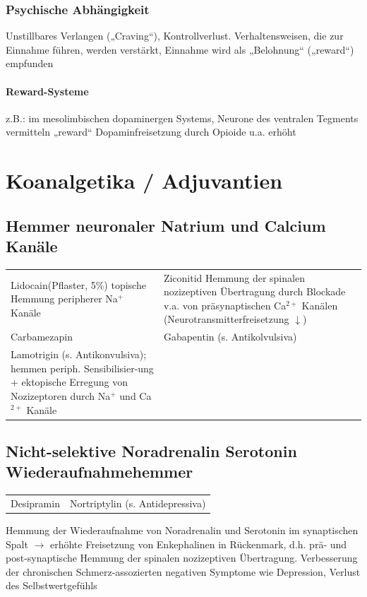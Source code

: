 \documentclass[10pt,a4paper]{report}
\begin{document}
\subsubsection{Psychische Abhängigkeit} %
\label{par:psychische_abh_ngigkeit}
Unstillbares Verlangen („Craving“), Kontrollverlust. Verhaltensweisen, die zur Einnahme führen, werden verstärkt, Einnahme wird als „Belohnung“ („reward“) empfunden
\paragraph{Reward-Systeme} %
\label{subp:reward_systeme}
z.B.: im mesolimbischen dopaminergen Systems, Neurone des ventralen Tegments vermitteln „reward“ Dopaminfreisetzung durch Opioide u.a. erhöht
\section{Koanalgetika / Adjuvantien} %
\label{sec:koanalgetika_adjuvantien}
\subsection{Hemmer neuronaler Natrium und Calcium Kanäle} %
\begin{tabularx}{\textwidth}{XX}
Lidocain(Pflaster, 5\%)  topische Hemmung peripherer Na$^+$ Kanäle&Ziconitid Hemmung der spinalen nozizeptiven Übertragung durch Blockade v.a. von präsynaptischen  Ca$^{2+}$ Kanälen (Neurotransmitterfreisetzung $\downarrow$)\\
Carbamezapin&Gabapentin (s. Antikolvulsiva)\\
Lamotrigin (s. Antikonvulsiva); hemmen periph. Sensibilisier-ung + ektopische Erregung von Nozizeptoren durch Na$^+$ und Ca$^{2+}$ Kanäle\\
\end{tabularx}
\subsection{Nicht-selektive Noradrenalin Serotonin Wiederaufnahmehemmer    } %
\label{sub:nicht_selektive_noradrenalin_serotonin_wiederaufnahmehemmer_}
\begin{tabularx}{\textwidth}{XX}
Desipramin&Nortriptylin (s. Antidepressiva)\\
\end{tabularx}
Hemmung der Wiederaufnahme von Noradrenalin und Serotonin im synaptischen Spalt $\rightarrow$ erhöhte Freisetzung von Enkephalinen in Rückenmark, d.h. prä- und post-synaptische Hemmung der spinalen nozizeptiven Übertragung. Verbesserung der chronischen Schmerz-assozierten negativen Symptome wie Depression, Verlust des Selbstwertgefühls
\end{document}
